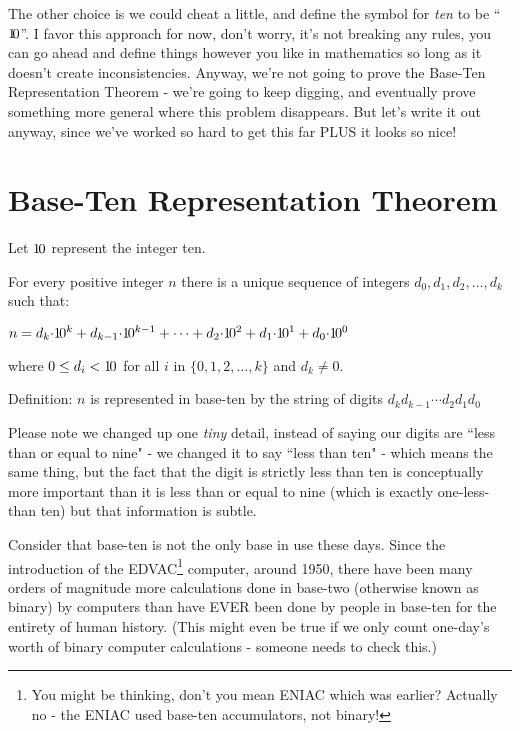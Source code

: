 \documentclass{article}
\newenvironment{jprIn}{\begin{adjustwidth}{2em}{}}{\end{adjustwidth}}
\begin{document}
The other choice is we could cheat a little,
and define the symbol for \emph{ten} to be ``$1\hspace{-0.2em}0$''.
I favor this approach for now, don't worry, it's not breaking any rules,
you can go ahead and define things
however you like in mathematics so long as it doesn't create inconsistencies.
Anyway, we're not going
to prove the Base-Ten Representation Theorem - we're going to keep digging,
and eventually prove something more general where this problem disappears.
But let's write it out anyway, since we've worked so hard to get this far PLUS
it looks so nice!

\section*{Base-Ten Representation Theorem}
\begin{jprIn}
Let ${1\hspace{-0.12em}0}$ represent the integer ten.

For every positive integer $n$ there is a unique
sequence of integers $d_0, d_1, d_2,\dots{},d_k$ such that:

\hspace{3em}$n=d_k{\cdot}{1\hspace{-0.12em}0}^k+d_{k-1}{\cdot}{1\hspace{-0.12em}0}^{k-1}+\dots+d_2{\cdot}{1\hspace{-0.12em}0}^2+d_1{\cdot}{1\hspace{-0.12em}0}^1+d_0{\cdot}{1\hspace{-0.12em}0}^0$

where $0\le{}d_i<{1\hspace{-0.12em}0}$ for all $i$ in $\{0,1,2,\dots{},k\}$ and $d_k\ne0$.

Definition: $n$ is represented in base-ten by the string of digits $d_kd_{k-1}{\cdots}d_2d_1d_0$
\end{jprIn}

Please note we changed up one \emph{tiny} detail, instead of saying our digits are
``less than or equal to nine" - we changed it to say ``less than ten" - which means
the same thing, but the fact that the digit is strictly less than ten
is conceptually more important than it is less than or equal to nine (which is
exactly one-less-than ten) but that information is subtle.

\bigskip
Consider that base-ten is not the only base in use these days.
Since the introduction of the EDVAC\footnote{You might be thinking, don't you
mean ENIAC which was earlier? Actually no - the ENIAC
used base-ten accumulators, not binary!} computer, around 1950,
there have been many orders of magnitude more calculations done
in base-two (otherwise known as binary) by computers than have EVER
been done by people in base-ten for the entirety of human history.
(This might even be true if we only count one-day's worth of
binary computer calculations - someone needs to check this.)
\end{document}
